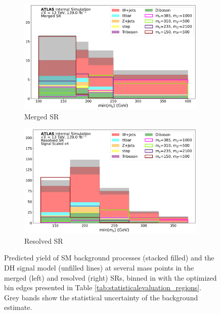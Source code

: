 \begin{figure}[htbp]
  \centering
    \begin{subfigure}[t]{0.48\textwidth}
    \centering
     \includegraphics[width = 0.99\textwidth]{Figures/7/SR1L_Merged_fit/TARJets10_minmS_mgd.pdf}
    \caption{Merged SR}
    \end{subfigure}
    \begin{subfigure}[t]{0.48\textwidth}
    \centering
     \includegraphics[width = 0.99\textwidth]{Figures/7/SR1L_Resolved_fit/TARJets10_minmS_res.pdf}
     \caption{Resolved SR}
    \end{subfigure}
    \caption[Predicted yield of SM background processes and the Dark Higgs signal model at several mass points in the signal regions, binned in \minms with optimized bin edges.]{Predicted yield of SM background processes (stacked filled) and the DH signal model (unfilled lines) at several mass points in the merged (left) and resolved (right) SRs, binned in \minms with the optimized bin edges presented in Table \ref{tab:statisticalevaluation_regions}. Grey bands show the statistical uncertainty of the background estimate.}
   \label{fig:minms_binning}
\end{figure}

